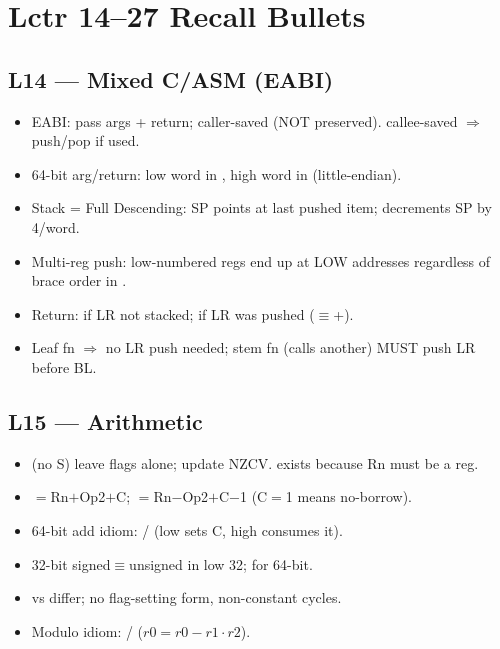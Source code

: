 \section{Lctr 14--27 Recall Bullets}

\subsection{L14 --- Mixed C/ASM (EABI)}
\begin{itemize}
\item EABI:  pass args + return; caller-saved (NOT preserved).  callee-saved $\Rightarrow$ push/pop if used.
\item 64-bit arg/return: low word in , high word in  (little-endian).
\item Stack = Full Descending: SP points at last pushed item;  decrements SP by 4/word.
\item Multi-reg push: low-numbered regs end up at LOW addresses regardless of brace order in .
\item Return:  if LR not stacked;  if LR was pushed ($\equiv$+).
\item Leaf fn $\Rightarrow$ no LR push needed; stem fn (calls another) MUST push LR before BL.
\end{itemize}

\subsection{L15 --- Arithmetic}
\begin{itemize}
\item {} (no S) leave flags alone;  update NZCV.  exists because Rn must be a reg.
\item {}$=$Rn$+$Op2$+$C; $=$Rn$-$Op2$+$C$-$1 (C$=$1 means no-borrow).
\item 64-bit add idiom:  /  (low sets C, high consumes it).
\item {} 32-bit signed$\equiv$unsigned in low 32;  for 64-bit.
\item {} vs  differ; no flag-setting form, non-constant cycles.
\item Modulo idiom:  /  ($r0=r0-r1\cdot r2$).
\end{itemize}

